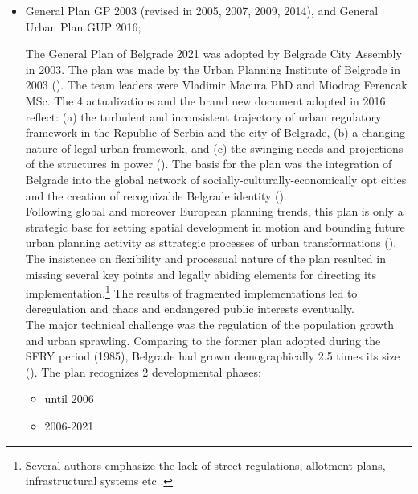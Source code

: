 \documentclass[11pt]{report}
\begin{document}
\begin{itemize}
\item General Plan GP 2003 (revised in 2005, 2007, 2009, 2014), and General Urban Plan GUP 2016;

The  General  Plan  of  Belgrade  2021 was adopted  by  Belgrade  City Assembly in 2003.
The plan was made by  the  Urban  Planning  Institute  of  Belgrade  in  2003 (\cite{ref Official Gazette of the City of Belgrade no 27/03}). The team leaders were Vladimir Macura PhD and Miodrag Ferencak MSc.
The 4 actualizations and the brand new document adopted in 2016 reflect:
(a) the turbulent and inconsistent trajectory of urban regulatory framework in the Republic of Serbia and the city of Belgrade,
(b) a changing nature of legal urban framework, and
(c) the swinging needs and projections of the structures in power
(\cite{Vukmirovic in Doytchinov et al 2015}).
The basis for the plan was the integration of Belgrade into the global network of socially-culturally-economically opt cities and the creation of recognizable Belgrade identity (\cite{ref}).
\\
Following global and moreover European planning trends, this plan is only a  strategic base for setting spatial development in motion and bounding future urban planning activity as sttrategic processes of urban transformations (\href{}{\citealt{grozdanic_belgrade_2008}}).
The insistence on flexibility and processual nature of the plan resulted in missing several key points and legally abiding elements for directing its implementation.\footnote{Several authors emphasize the lack of street regulations,  allotment plans, infrastructural systems etc \cite{ref}.}
The results of fragmented implementations led to deregulation and chaos and endangered public interests eventually.
\\
The major technical challenge was the regulation of the population growth and urban sprawling.
Comparing to the former plan adopted during the SFRY period (1985), Belgrade had grown demographically 2.5 times its size (\cite{ref}).
The plan recognizes 2 developmental phases:

\begin{itemize}
\item until 2006
\item 2006-2021
\end{itemize}


\end{itemize}
\end{document}
